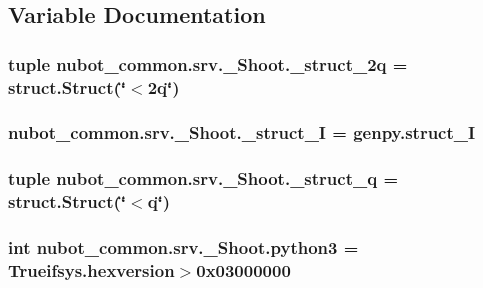 \subsection{Variable Documentation}
\hypertarget{namespacenubot__common_1_1srv_1_1__Shoot_a0e554cd32733a7381460d65aba94d4ce}{
\subsubsection[{\-\_\-struct\-\_\-2q}]{\setlength{\rightskip}{0pt plus 5cm}tuple nubot\-\_\-common.\-srv.\-\_\-\-Shoot.\-\_\-struct\-\_\-2q = struct.\-Struct(\char`\"{}$<$2q\char`\"{})}}\label{namespacenubot__common_1_1srv_1_1__Shoot_a0e554cd32733a7381460d65aba94d4ce}
\hypertarget{namespacenubot__common_1_1srv_1_1__Shoot_a9c5865df70832f1d7ba597991610b22a}{
\subsubsection[{\-\_\-struct\-\_\-\-I}]{\setlength{\rightskip}{0pt plus 5cm}nubot\-\_\-common.\-srv.\-\_\-\-Shoot.\-\_\-struct\-\_\-\-I = genpy.\-struct\-\_\-\-I}}\label{namespacenubot__common_1_1srv_1_1__Shoot_a9c5865df70832f1d7ba597991610b22a}
\hypertarget{namespacenubot__common_1_1srv_1_1__Shoot_ab9ca5ae6841b4905cc57179787e9b6e6}{
\subsubsection[{\-\_\-struct\-\_\-q}]{\setlength{\rightskip}{0pt plus 5cm}tuple nubot\-\_\-common.\-srv.\-\_\-\-Shoot.\-\_\-struct\-\_\-q = struct.\-Struct(\char`\"{}$<$q\char`\"{})}}\label{namespacenubot__common_1_1srv_1_1__Shoot_ab9ca5ae6841b4905cc57179787e9b6e6}
\hypertarget{namespacenubot__common_1_1srv_1_1__Shoot_a344b19f8d7fbcaefc496a25053316360}{
\subsubsection[{python3}]{\setlength{\rightskip}{0pt plus 5cm}int nubot\-\_\-common.\-srv.\-\_\-\-Shoot.\-python3 = Trueifsys.\-hexversion$>$0x03000000}}\label{namespacenubot__common_1_1srv_1_1__Shoot_a344b19f8d7fbcaefc496a25053316360}
